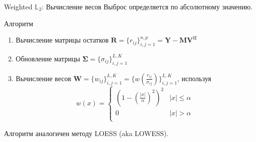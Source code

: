 \documentclass[ucs, notheorems, handout]{beamer}
\begin{document}

\begin{frame}{Weighted $\mathbb{L}_2$: Вычисление весов}
Выброс определяется по абсолютному значению.
    \begin{block}{Алгоритм}
    \begin{enumerate}
        \item Вычисление матрицы остатков $\mathbf{R} = \{r_{ij}\}_{i,j=1}^{n,p} = \mathbf{Y} - \mathbf{M}\mathbf{V}^\mathrm{H}$
        \item Обновление матрицы $\mathbf{\Sigma} =      \{\sigma_{ij}\}^{L,K}_{i,j=1}$
        \item Вычисление весов $\mathbf{W} = \{w_{ij}\}^{L,K}_{i,j=1} = \{w(\frac{r_{ij}}{\sigma_{ij}})\}^{L,K}_{i,j=1}$, используя
        $$w(x) = 
        \begin{cases}
        (1 - (\frac{|x|}{\alpha})^2)^2 &|x| \leq \alpha\\
        0 &|x| > \alpha\\
        \end{cases}$$
    \end{enumerate}    
    \end{block}
    Алгоритм аналогичен методу LOESS (aka LOWESS).
    \note{}
\end{frame}
\end{document}

